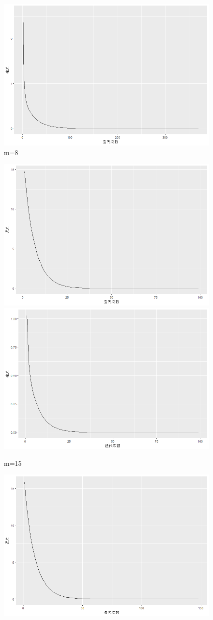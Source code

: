 \documentclass[10pt]{article}
\begin{document}
\begin{enumerate}
\begin{figure}[H]
  \includegraphics[width=.8\textwidth]{4-m=82.png}
  \caption{m=8}
  \end{figure}
  \begin{figure}[H]
  \centering
  \includegraphics[width=.8\textwidth]{4-m=151.png}
  \includegraphics[width=.8\textwidth]{4-m=152.png}
  \caption{m=15}
  \end{figure}
  \begin{figure}[H]
  \centering
  \includegraphics[width=.8\textwidth]{4-m=201.png}

\end{figure}
\end{enumerate}
\end{document}
